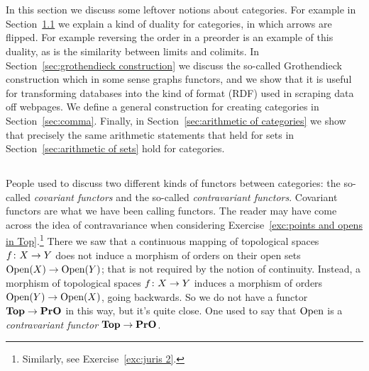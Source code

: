\documentclass[CT4S-EN-RU]{subfiles}
\begin{document}
\section{}

\begin{blockENG}
In this section we discuss some leftover notions about categories. For example in Section~\ref{sec:opposite} we explain a kind of duality for categories, in which arrows are flipped. For example reversing the order in a preorder is an example of this duality, as is the similarity between limits and colimits. In Section~\ref{sec:grothendieck construction} we discuss the so-called Grothendieck construction which in some sense graphs functors, and we show that it is useful for transforming databases into the kind of format (RDF) used in scraping data off webpages. We define a general construction for creating categories in Section~\ref{sec:comma}. Finally, in Section~\ref{sec:arithmetic of categories} we show that precisely the same arithmetic statements that held for sets in Section~\ref{sec:arithmetic of sets} hold for categories. 
\end{blockENG}

\begin{blockRUS}
\end{blockRUS}


\subsection{}\label{sec:opposite}

\begin{blockENG}
People used to discuss two different kinds of functors between categories: the so-called {\em covariant functors} and the so-called {\em contravariant functors}. Covariant functors are what we have been calling functors. The reader may have come across the idea of contravariance when considering Exercise~\ref{exc:points and opens in Top}.\footnote{Similarly, see Exercise~\ref{exc:juris 2}.} There we saw that a continuous mapping of topological spaces $f\colon X\rightarrow Y$ does not induce a morphism of orders on their open sets $\textnormal{Open}(X)\rightarrow\textnormal{Open}(Y)$; that is not required by the notion of continuity. Instead, a morphism of topological spaces $f\colon X\rightarrow Y$ induces a morphism of orders $\textnormal{Open}(Y)\rightarrow\textnormal{Open}(X)$, going backwards. So we do not have a functor ${\mathbf{Top}}\rightarrow{\mathbf{PrO}}$ in this way, but it's quite close. One used to say that $\textnormal{Open}$ is a {\em contravariant functor} ${\mathbf{Top}}\rightarrow{\mathbf{PrO}}$.
\end{blockENG}
\end{document}
